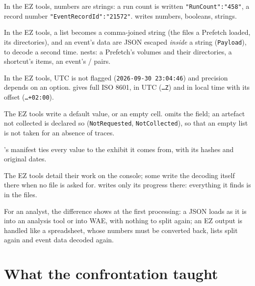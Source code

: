 \documentclass[11pt,a4paper,oneside]{report}
\begin{document}
\begin{description}[style=nextline,leftmargin=1em]
  \item[Types] In the EZ tools, numbers are strings: a run count is written
        \texttt{"RunCount":"458"}, a record number
        \texttt{"EventRecordId":"21572"}. \wac{} writes numbers, booleans,
        strings.
  \item[Structures] In the EZ tools, a list becomes a comma-joined string (the
        files a Prefetch loaded, its directories), and an event's data are JSON
        escaped \emph{inside} a string (\texttt{Payload}), to decode a second
        time. \wac{} nests: a Prefetch's volumes and their directories, a
        shortcut's items, an event's / pairs.
  \item[Dates] In the EZ tools, UTC is not flagged
        (\texttt{2026-09-30 23:04:46}) and precision depends on an option. \wac{}
        gives full ISO 8601, in UTC (\texttt{…Z}) and in local time with its
        offset (\texttt{…+02:00}).
  \item[Missing value] The EZ tools write a default value, or an empty cell.
        \wac{} omits the field; an artefact not collected is declared so
        (\texttt{NotRequested}, \texttt{NotCollected}), so that an empty list is
        not taken for an absence of traces.
  \item[Provenance] \wac{}'s manifest ties every value to the exhibit it comes
        from, with its hashes and original dates.
  \item[Console] The EZ tools detail their work on the console; some write the
        decoding itself there when no file is asked for. \wac{} writes only its
        progress there: everything it finds is in the files.
\end{description}

\begin{note}
For an analyst, the difference shows at the first processing: a \wac{} JSON
loads as it is into an analysis tool or into WAE, with nothing to split again;
an EZ output is handled like a spreadsheet, whose numbers must be converted back,
lists split again and event data decoded again.
\end{note}

\chapter{What the confrontation taught \wac{}}\label{chap:defects}
\end{document}
